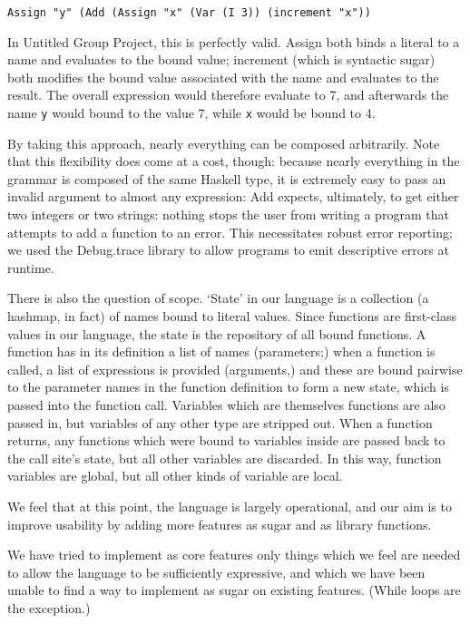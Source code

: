 \documentclass{article}
\begin{document}
\begin{lstlisting}
Assign "y" (Add (Assign "x" (Var (I 3)) (increment "x"))
\end{lstlisting}

In Untitled Group Project, this is perfectly valid.  Assign both binds a literal to a name and evaluates to the bound value; increment (which is syntactic sugar) both modifies the bound value associated with the name and evaluates to the result.  The overall expression would therefore evaluate to 7, and afterwards the name \texttt{y} would bound to the value 7, while \texttt{x} would be bound to 4.

By taking this approach, nearly everything can be composed arbitrarily.  Note that this flexibility does come at a cost, though: because nearly everything in the grammar is composed of the same Haskell type, it is extremely easy to pass an invalid argument to almost any expression: Add expects, ultimately, to get either two integers or two strings: nothing stops the user from writing a program that attempts to add a function to an error.  This necessitates robust error reporting; we used the Debug.trace library to allow programs to emit descriptive errors at runtime.

There is also the question of scope.  `State' in our language is a collection (a hashmap, in fact) of names bound to literal values.  Since functions are first-class values in our language, the state is the repository of all bound functions.  A function has in its definition a list of names (parameters;) when a function is called, a list of expressions is provided (arguments,) and these are bound pairwise to the parameter names in the function definition to form a new state, which is passed into the function call.  Variables which are themselves functions are also passed in, but variables of any other type are stripped out.  When a function returns, any functions which were bound to variables inside are passed back to the call site's state, but all other variables are discarded.  In this way, function variables are global, but all other kinds of variable are local.

We feel that at this point, the language is largely operational, and our aim is to improve usability by adding more features as sugar and as library functions.

We have tried to implement as core features only things which we feel are needed to allow the language to be sufficiently expressive, and which we have been unable to find a way to implement as sugar on existing features.  (While loops are the exception.)
\end{document}
